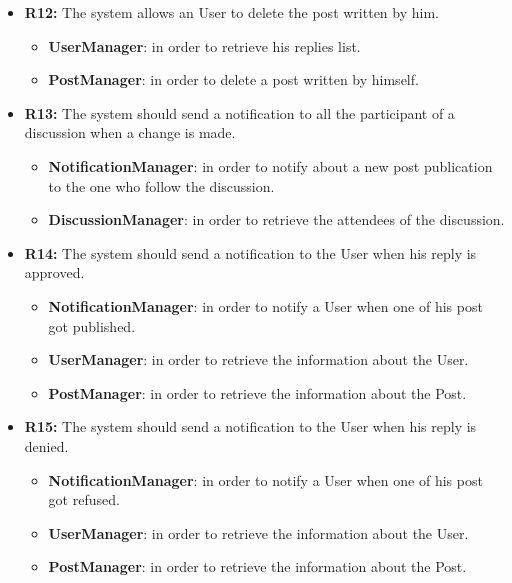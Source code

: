 \begin{itemize}
\item \textbf{R12:} The system allows an User to delete the post written by him.

\begin{itemize}
    \item \textbf{UserManager}: in order to retrieve his replies list.
    \item \textbf{PostManager}: in order to delete a post written by himself.
\end{itemize}

\item \textbf{R13:} The system should send a notification to all the participant of a discussion when a change is made.

\begin{itemize}
    \item \textbf{NotificationManager}: in order to notify about a new post publication to the one who follow the discussion.
    \item \textbf{DiscussionManager}: in order to retrieve the attendees of the discussion.
\end{itemize}

\item \textbf{R14:} The system should send a notification to the User when his reply is approved.

\begin{itemize}
    \item \textbf{NotificationManager}: in order to notify a User when one of his post got published.
    \item \textbf{UserManager}: in order to retrieve the information about the User.
    \item \textbf{PostManager}: in order to retrieve the information about the Post.
\end{itemize}

\item \textbf{R15:} The system should send a notification to the User when his reply is denied.

\begin{itemize}
    \item \textbf{NotificationManager}: in order to notify a User when one of his post got refused.
    \item \textbf{UserManager}: in order to retrieve the information about the User.
    \item \textbf{PostManager}: in order to retrieve the information about the Post.
\end{itemize}


\end{itemize}
